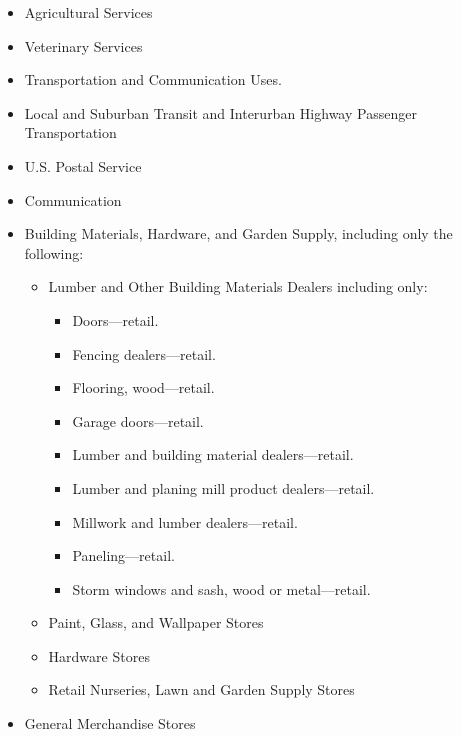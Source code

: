 \begin{itemize}
\item Agricultural Services

\item Veterinary Services

\item Transportation and Communication Uses.

\item Local and Suburban Transit and Interurban Highway Passenger Transportation

\item U.S. Postal Service

\item Communication 

\item Building Materials, Hardware, and Garden Supply, including only the
following:
\begin{itemize}
\item Lumber and Other Building Materials Dealers including only:
\begin{itemize}
\item Doors---retail.

\item Fencing dealers---retail.

\item Flooring, wood---retail.

\item Garage doors---retail.

\item Lumber and building material dealers---retail.

\item Lumber and planing mill product dealers---retail.

\item Millwork and lumber dealers---retail.

\item Paneling---retail.

\item Storm windows and sash, wood or metal---retail.
\end{itemize}
\item Paint, Glass, and Wallpaper Stores 

\item Hardware Stores 

\item Retail Nurseries, Lawn and Garden Supply Stores 
\end{itemize}
\item General Merchandise Stores 


\end{itemize}
